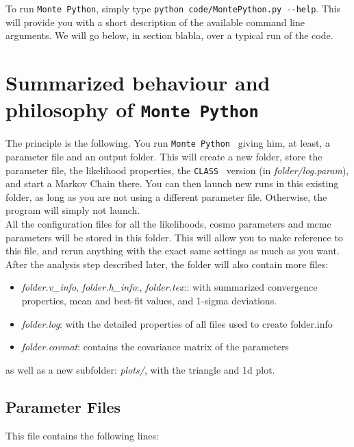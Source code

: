 \documentclass[10pt]{article}
\newcommand{\CLASS}{\texttt{CLASS}}
\newcommand{\MP}{\texttt{Monte Python}}
\begin{document}
 
 To run \MP, simply type \verb?python code/MontePython.py --help?. This will provide you with a short description of the available command line arguments. We will go below, in section blabla, over a typical run of the code.
 
\newpage
\section{Summarized behaviour and philosophy of \MP}

  The principle is the following. You run \MP~ giving him, at least, a
  parameter file and an output folder. This will create a new folder, store the
  parameter file, the likelihood properties, the \CLASS~ version (in
  \emph{folder/log.param}), and start a Markov Chain there.  You can then
  launch new runs in this existing folder, as long as you are not using a different
  parameter file. Otherwise, the program will simply not launch. \\

  All the configuration files for all the likelihoods, cosmo parameters and
  mcmc parameters will be stored in this folder. This will allow you to make
  reference to this file, and rerun anything with the exact same settings as much
  as you want.\\

  After the analysis step described later, the folder will also contain more files:
  \begin{itemize}
    \item \emph{folder.v\_info}, \emph{folder.h\_info}:, \emph{folder.tex}:: with summarized convergence properties, mean and
      best-fit values, and 1-sigma deviations.
    \item \emph{folder.log}:  with the detailed properties of all files used to create
      folder.info
    \item \emph{folder.covmat}: contains the covariance matrix of the parameters
  \end{itemize}
  as well as a new subfolder: \emph{plots/}, with the triangle and 1d plot.



  \subsection{Parameter Files}
  This file contains the following lines:
\end{document}
